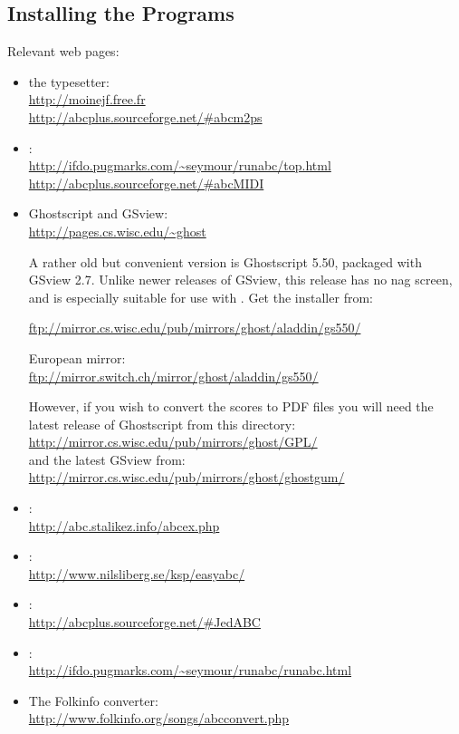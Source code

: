 \documentclass[a4paper,fullpage,12pt]{book}
\begin{document}

\subsection{Installing the Programs}

Relevant web pages:

\begin{itemize}
  
  \item the \abcm{} typesetter:\\
  \url{http://moinejf.free.fr}\\
  \url{http://abcplus.sourceforge.net/#abcm2ps}

  \item \abcmid:\\
  \url{http://ifdo.pugmarks.com/~seymour/runabc/top.html}\\
  \url{http://abcplus.sourceforge.net/#abcMIDI}

  \item Ghostscript and GSview:\\
  \url{http://pages.cs.wisc.edu/~ghost}
  
  A rather old but convenient version is Ghostscript 5.50, packaged
  with GSview 2.7. Unlike newer releases of GSview, this release has
  no nag screen, and is especially suitable for use with \jedabc. Get
  the installer  from:
  
  \url{ftp://mirror.cs.wisc.edu/pub/mirrors/ghost/aladdin/gs550/}
  
  European mirror:\\
  \url{ftp://mirror.switch.ch/mirror/ghost/aladdin/gs550/}
  
  However, if you wish to convert the scores to PDF files you will
  need the latest release of Ghostscript from this directory:\\
  \url{http://mirror.cs.wisc.edu/pub/mirrors/ghost/GPL/}\\ and the
  latest GSview from:\\
  \url{http://mirror.cs.wisc.edu/pub/mirrors/ghost/ghostgum/}
  
  \item \abcexplorer:\\
  \url{http://abc.stalikez.info/abcex.php}

  \item \easyabc:\\
  \url{http://www.nilsliberg.se/ksp/easyabc/}

  \item \jedabc{}:\\
  \url{http://abcplus.sourceforge.net/#JedABC}
  
  \item {}:\\
  \url{http://ifdo.pugmarks.com/~seymour/runabc/runabc.html}
  
  \item The Folkinfo converter:\\
  \url{http://www.folkinfo.org/songs/abcconvert.php}
  
\end{itemize}
\end{document}
